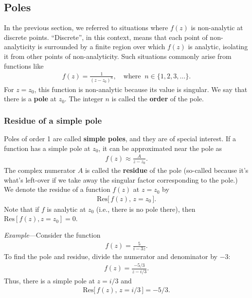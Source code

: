 \documentclass[10pt,a4paper]{article}
\begin{document}
\subsection{Poles}
\label{poles}

In the previous section, we referred to situations where $f(z)$ is
non-analytic at discrete points.  ``Discrete'', in this context, means
that each point of non-analyticity is surrounded by a finite region
over which $f(z)$ is analytic, isolating it from other points of
non-analyticity. Such situations commonly arise from functions like
\begin{align}
  f(z) = \frac{1}{(z-z_0)^n}, \quad \mathrm{where}\;\; n\in\{1,2,3,\dots\}.
\end{align}
For $z = z_0$, this function is non-analytic because its value is
singular.  We say that there is a \textbf{pole} at $z_0$.  The integer
$n$ is called the \textbf{order} of the pole.

\subsubsection{Residue of a simple pole}
\label{residue-of-a-simple-pole}

Poles of order 1 are called \textbf{simple poles}, and they are of
special interest. If a function has a simple pole at $z_0$, it can be
approximated near the pole as
\begin{align}
  f(z) \approx \frac{A}{z-z_0}.
\end{align}
The complex numerator $A$ is called the \textbf{residue} of the pole
(so-called because it's what's left-over if we take away the singular
factor corresponding to the pole.) We denote the residue of a function
$f(z)$ at $z = z_0$ by
\begin{align}
  \mathrm{Res}\big[\,f(z), \, z = z_0\,\big].
\end{align}
Note that if $f$ is analytic at $z_0$ (i.e., there is no pole there),
then $\mathrm{Res}[f(z), z = z_0] = 0$.

\begin{framed}\noindent
  \textit{Example}---Consider the function
  \begin{align}
    f(z) = \frac{5}{i-3z}.
  \end{align}
To find the pole and residue, divide the numerator and denominator by $-3$:
\begin{align}
  f(z) = \frac{-5/3}{z-i/3}.
\end{align}
Thus, there is a simple pole at $z = i/3$ and
\begin{align}
  \mathrm{Res}\big[\,f(z),\, z = i/3\,\big] = - 5/3.
\end{align}
\end{framed}
\end{document}
